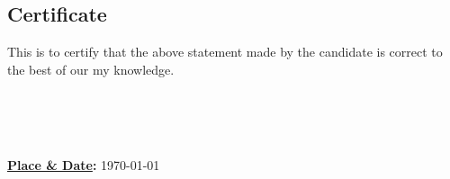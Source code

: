 \begin{minipage}{\textwidth}
    \begin{flushleft}
        {\let\clearpage\relax\chapter*{\centering Certificate}}

        This is to certify that the above statement made by the candidate is correct to the best of 
        \ifdefined\multipleadvisors our \else my \fi 
        knowledge.

        \vspace{0.4in}

            
        \begin{minipage}{0.45\textwidth}
            \begin{flushleft}
                
            
                \textbf{\advisorone}
                \textbf{
                    \ifx\advisortwo\empty\else      \\\advisortwo\fi 
                    \ifx\advisorthree\empty\else    \\\advisorthree\fi 
                    \ifx\advisorfour\empty\else     \\\advisorfour\fi   
                }
            \end{flushleft}
            
        \end{minipage}%
        \hfill
        \begin{minipage}{0.45\textwidth}
            \textbf{\underline{Place \& Date}:} \today
        \end{minipage}%
    \end{flushleft}
\end{minipage}